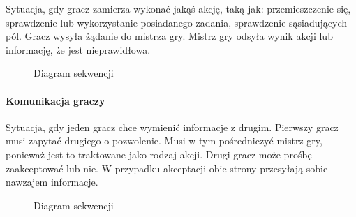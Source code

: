 \documentclass[11pt]{article}
\begin{document}
Sytuacja, gdy gracz zamierza wykonać jakąś akcję, taką jak: przemieszczenie się, sprawdzenie lub wykorzystanie posiadanego zadania, sprawdzenie sąsiadujących pól.
Gracz wysyła żądanie do mistrza gry. Mistrz gry odsyła wynik akcji lub informację, że jest nieprawidłowa.

\begin{figure}[!h]
	\centering
	\caption{Diagram sekwencji}
		\hspace*{-2cm}
\end{figure}
\FloatBarrier

\paragraph{Komunikacja graczy}

Sytuacja, gdy jeden gracz chce wymienić informacje z drugim. Pierwszy gracz musi zapytać drugiego o pozwolenie. Musi w tym pośredniczyć mistrz gry, ponieważ jest to traktowane jako rodzaj akcji. Drugi gracz może prośbę zaakceptować lub nie. W przypadku akceptacji obie strony przesyłają sobie nawzajem informacje.

\begin{figure}[!h]
	\centering
	\caption{Diagram sekwencji}
		\hspace*{-2.5cm}
\end{figure}
\FloatBarrier
\par
\end{document}

